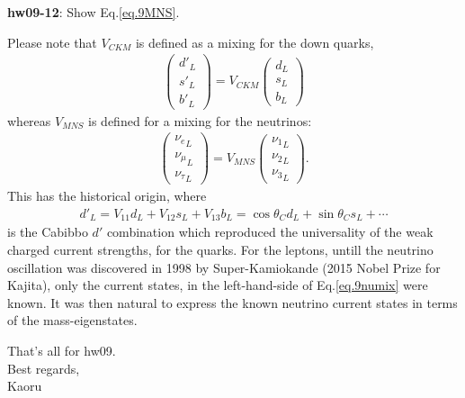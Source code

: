 \documentclass[12pt]{article}
\begin{document}
{\bf hw09-12}: Show Eq.\ref{eq.9MNS}.

  Please note that $V_{CKM}$ is defined as a mixing for the down quarks,
\begin{eqnarray}
   \begin{pmatrix}
    d'_L \\ s'_L \\ b'_L
   \end{pmatrix}
   = V_{CKM}
   \begin{pmatrix}
    d_L \\ s_L \\ b_L
   \end{pmatrix}
\end{eqnarray}
 whereas $V_{MNS}$ is defined for a mixing for the neutrinos:
\begin{eqnarray}
  \begin{pmatrix}
    {\nu_e}_L \\ {\nu_\mu}_L \\ {\nu_\tau}_L
   \end{pmatrix} 
   =V_{MNS}
   \begin{pmatrix}
    {\nu_1}_L\\ {\nu_2}_L \\ {\nu_3}_L
   \end{pmatrix}. \label{eq.9numix}
\end{eqnarray}
   This has the historical origin, where
\begin{eqnarray}
  d'_L = V_{11} d_L + V_{12} s_L + V_{13} b_L
          = \cos\theta_C d_L + \sin\theta_C s_L + \cdots 
\end{eqnarray}
  is the Cabibbo $d'$ combination which reproduced the universality of 
the weak charged current strengths, for the quarks.  For the leptons,
  untill the neutrino oscillation was discovered in 1998 by
  Super-Kamiokande (2015 Nobel Prize for Kajita), only the current
  states, in the left-hand-side of Eq.\ref{eq.9numix} were known. It was then
  natural to express the known neutrino current states in terms of
  the mass-eigenstates.

That's all for hw09.\\

Best regards,\\

Kaoru
\end{document}
